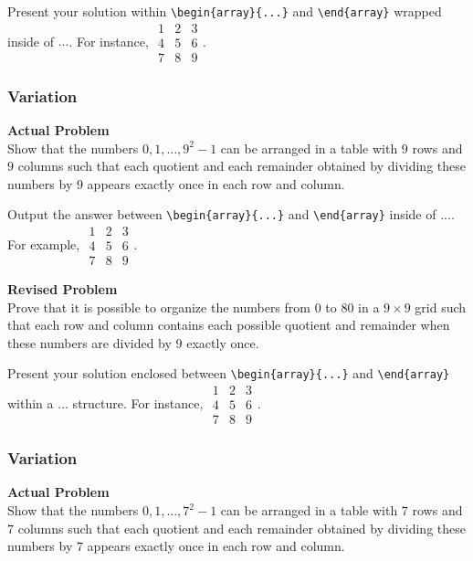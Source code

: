 Present your solution within \verb|\begin{array}{...}| and \verb|\end{array}| wrapped inside of $\boxed{...}$. For instance, $\boxed{\begin{array}{ccc}1 & 2 & 3 \\ 4 & 5 & 6 \\ 7 & 8 & 9\end{array}}$.

\subsubsection{Variation}
\textbf{Actual Problem}\\
Show that the numbers $0,1, \ldots, 9^{2}-1$ can be arranged in a table with $9$ rows and $9$ columns such that each quotient and each remainder obtained by dividing these numbers by $9$ appears exactly once in each row and column.

Output the answer between \verb|\begin{array}{...}| and \verb|\end{array}| inside of $\boxed{...}$. For example, $\boxed{\begin{array}{ccc}1 & 2 & 3 \\ 4 & 5 & 6 \\ 7 & 8 & 9\end{array}}$.

\textbf{Revised Problem}\\
Prove that it is possible to organize the numbers from $0$ to $80$ in a $9 \times 9$ grid such that each row and column contains each possible quotient and remainder when these numbers are divided by $9$ exactly once.

Present your solution enclosed between \verb|\begin{array}{...}| and \verb|\end{array}| within a $\boxed{...}$ structure. For instance, $\boxed{\begin{array}{ccc}1 & 2 & 3 \\ 4 & 5 & 6 \\ 7 & 8 & 9\end{array}}$.

\subsubsection{Variation}
\textbf{Actual Problem}\\
Show that the numbers $0,1, \ldots, 7^{2}-1$ can be arranged in a table with $7$ rows and $7$ columns such that each quotient and each remainder obtained by dividing these numbers by $7$ appears exactly once in each row and column.

